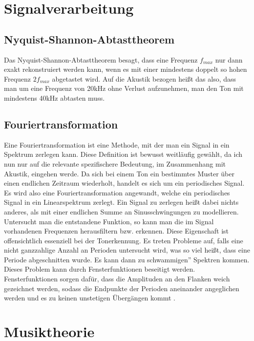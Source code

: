 \section{Signalverarbeitung}
\subsection*{Nyquist-Shannon-Abtasttheorem}
\label{sec:Abtast}
Das Nyquist-Shannon-Abtasttheorem besagt, dass eine Frequenz $f_{max}$ nur dann exakt rekonstruiert werden kann, wenn es mit einer mindestens doppelt so hohen Frequenz $2f_{max}$ abgetastet wird. Auf die Akustik bezogen heißt das also, dass man um eine Frequenz von 20kHz ohne Verlust aufzunehmen, 
man den Ton mit mindestens 40kHz abtasten muss.

\subsection*{Fouriertransformation}
\label{sec:Fouriertransformation}
Eine Fouriertransformation ist eine Methode, mit der man ein Signal in ein Spektrum zerlegen kann. Diese Definition ist bewusst weitläufig gewählt, da ich nun nur auf die relevante spezifischere Bedeutung, im Zusammenhang mit Akustik, eingehen werde.
Da sich bei einem Ton ein bestimmtes Muster über einen endlichen Zeitraum wiederholt, handelt es sich um ein periodisches Signal. Es wird also eine Fouriertransformation angewandt, welche ein
periodisches Signal in ein Linearspektrum zerlegt. Ein Signal zu zerlegen heißt dabei nichts anderes, als mit einer endlichen Summe an Sinusschwingungen zu modellieren. Untersucht man die entstandene Funktion, so kann man die im Signal vorhandenen Frequenzen 
herausfiltern bzw. erkennen. Diese Eigenschaft ist offensichtlich essenziell bei der Tonerkennung. Es treten Probleme auf, falls eine nicht ganzzahlige Anzahl an Perioden untersucht wird, was so viel heißt, dass eine Periode abgeschnitten wurde. Es kann dann zu \glqq schwammigen'' Spektren kommen.
Dieses Problem kann durch Fensterfunktionen beseitigt werden. Fensterfunktionen sorgen dafür, dass die Amplituden an den Flanken weich gezeichnet werden, sodass die Endpunkte der Perioden aneinander angeglichen werden und es zu keinen unstetigen Übergängen kommt \cite{Butz2006}.

\section{Musiktheorie}
